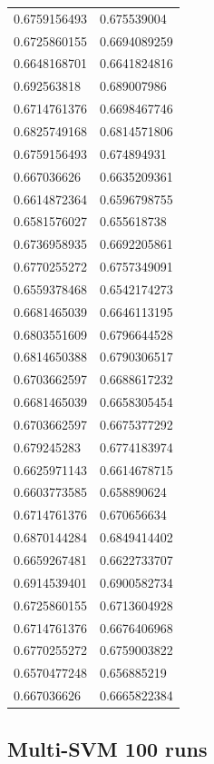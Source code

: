 \begin{longtable}{@{}ll@{}}
	0.6759156493 & 0.675539004  \\
	0.6725860155 & 0.6694089259 \\
	0.6648168701 & 0.6641824816 \\
	0.692563818  & 0.689007986  \\
	0.6714761376 & 0.6698467746 \\
	0.6825749168 & 0.6814571806 \\
	0.6759156493 & 0.674894931  \\
	0.667036626  & 0.6635209361 \\
	0.6614872364 & 0.6596798755 \\
	0.6581576027 & 0.655618738  \\
	0.6736958935 & 0.6692205861 \\
	0.6770255272 & 0.6757349091 \\
	0.6559378468 & 0.6542174273 \\
	0.6681465039 & 0.6646113195 \\
	0.6803551609 & 0.6796644528 \\
	0.6814650388 & 0.6790306517 \\
	0.6703662597 & 0.6688617232 \\
	0.6681465039 & 0.6658305454 \\
	0.6703662597 & 0.6675377292 \\
	0.679245283  & 0.6774183974 \\
	0.6625971143 & 0.6614678715 \\
	0.6603773585 & 0.658890624  \\
	0.6714761376 & 0.670656634  \\
	0.6870144284 & 0.6849414402 \\
	0.6659267481 & 0.6622733707 \\
	0.6914539401 & 0.6900582734 \\
	0.6725860155 & 0.6713604928 \\
	0.6714761376 & 0.6676406968 \\
	0.6770255272 & 0.6759003822 \\
	0.6570477248 & 0.656885219  \\
	0.667036626  & 0.6665822384 \\ \bottomrule
\end{longtable}

\subsection{Multi-SVM 100 runs}


